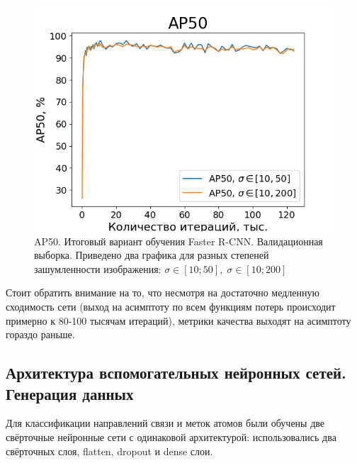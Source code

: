 \begin{figure}[h!] 
	\center
	\includegraphics [scale=0.8] {my_folder/images/AP50_second}
	\caption{AP50. Итоговый вариант обучения Faster R-CNN. Валидационная выборка. Приведено два графика для разных степеней зашумленности изображения: $\sigma \in [10; 50], \; \sigma \in [10; 200]$}
	\label{fig:AP50_second}
\end{figure}

Стоит обратить внимание на то, что несмотря на достаточно медленную сходимость сети (выход на асимптоту по всем функциям потерь происходит примерно к 80-100 тысячам итераций), метрики качества выходят на асимптоту гораздо раньше.

\subsection{Архитектура вспомогательных нейронных сетей. Генерация данных} \label{ch2:sec3:arch}

Для классификации направлений связи и меток атомов были обучены две свёрточные нейронные сети с одинаковой архитектурой:
использовались два свёрточных слоя, flatten, dropout и dense слои.


